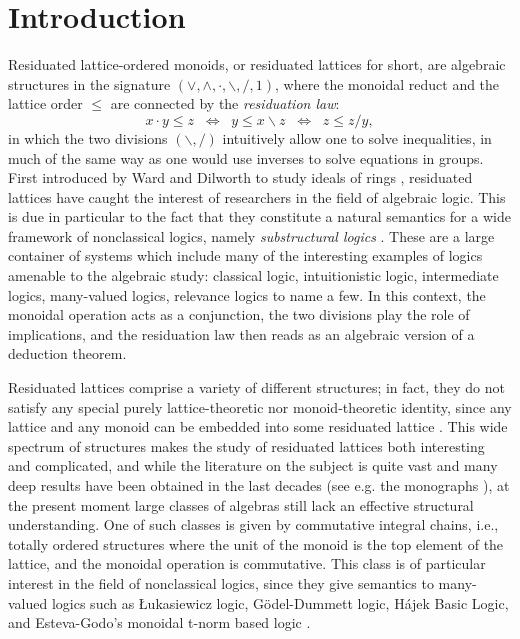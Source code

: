 \documentclass{amsart}
\theoremstyle{definition}
\numberwithin{equation}{section}
\begin{document}
\section{Introduction}
Residuated lattice-ordered monoids, or residuated lattices for short, are algebraic structures in the signature $(\lor, \land, \cdot, \backslash, /, 1)$, where the monoidal reduct and the lattice order $\leq$ are connected by the {\em residuation law}:
$$x \cdot y \leq z \;\;\Leftrightarrow\;\; y \leq x \backslash z \;\;\Leftrightarrow\;\; z \leq z /y,$$
in which the two divisions $(\backslash, /)$ intuitively allow one to solve inequalities, in much of the same way as one would use inverses to solve equations in groups. First introduced by Ward and Dilworth to study ideals of rings \cite{WardDilworth}, residuated lattices have caught the interest of researchers in the field of algebraic logic. This is due in particular to the fact that they constitute a natural semantics for a wide framework of nonclassical logics, namely {\em substructural logics} \cite{GJKO,MPT2023}. These are a large container of systems which include many of the interesting examples of logics amenable to the algebraic study: classical logic, intuitionistic logic, intermediate logics, many-valued logics, relevance logics to name a few. In this context, the monoidal operation acts as a conjunction, the two divisions play the role of implications, and the residuation law then reads as an algebraic version of a deduction theorem.

Residuated lattices comprise a variety of different structures; in fact, they do not satisfy any special purely lattice-theoretic nor monoid-theoretic identity, since any lattice and any monoid can be embedded into some residuated lattice \cite{Bahlsetal,JipsenTsinakis}. 
This wide spectrum of structures makes the study of residuated lattices both interesting and complicated, and while the literature on the subject is quite vast and many deep results have been obtained in the last decades (see e.g. the monographs \cite{GJKO,MPT2023}), at the present moment large classes of algebras still lack an effective structural understanding. One of such classes is given by commutative integral chains, i.e., totally ordered structures where the
unit of the monoid is the top element of the lattice, and the monoidal operation is commutative. This class is of particular interest in the field of nonclassical logics, since they give semantics to many-valued logics such as \L ukasiewicz logic, G\"odel-Dummett logic, H\'ajek Basic Logic, and Esteva-Godo's monoidal t-norm based logic \cite{Hajek98,EstevaGodo2001}. 
\end{document}
